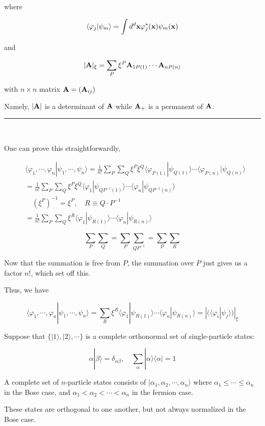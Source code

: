 where 

\[\langle\varphi_j|\psi_m\rangle = \int d^d {\bf x}\varphi_j^*({\bf x})\psi_m({\bf x}) \]

and

\[|{\bf A}|_{\xi} = \sum_{P}\xi^P {\bf A}_{1P(1)}\cdots{\bf A}_{nP(n)} \]

with $n\times n$ matrix ${\bf A} = ({\bf A}_{ij})$

Namely, $|{\bf A}|$ is a determinant of ${\bf A}$ while ${\bf A}_+$ is a permanent of ${\bf A}$. 

\hrule

\ 

One can prove this straightforwardly, 

\[\begin{split}
&\langle\varphi_1,\cdots,\varphi_n|\psi_1,\cdots,\psi_n\rangle =\frac{1}{n!}\sum_P\sum_Q\xi^P\xi^Q\langle\varphi_{P(1)}|\psi_{Q(1)}\rangle\cdots\langle\varphi_{P(n)}|\psi_{Q(n)}\rangle \\
& = \frac{1}{n!}\sum_{P}\sum_{Q}\xi^P\xi^Q\langle\varphi_1|\psi_{QP^{-1}(1)}\rangle\cdots\langle\varphi_n|\psi_{QP^{-1}(n)}\rangle\\
&\quad (\xi^P)^{-1} = \xi^P,\quad R\equiv Q\cdot P^{-1}\\
&= \frac{1}{n!} \sum_P\sum_Q\xi^R\langle\varphi_1|\psi_{R(1)}\rangle\cdots\langle\varphi_n|\psi_{R(n)}\rangle
\end{split}\]

\[\sum_P\sum_Q = \sum_P\sum_{QP^{-1}}=\sum_P\sum_R \]

Now that the summation is free from $P$, the summation over $P$ just gives us a factor $n!$, which set off this. 

Thus, we have

\[\langle\varphi_1,\cdots,\varphi_n|\psi_1,\cdots,\psi_n\rangle = \sum_R\xi^R\langle\varphi_1|\psi_{R(1)}\rangle\cdots\langle\varphi_n|\psi_{R(n)}\rangle = |(\langle\varphi_i|\psi_j\rangle)|_\xi \]

Suppose that $\{|1\rangle,|2\rangle,\cdots\}$ is a complete orthonormal set of single-particle states:

\[\alpha|\beta\rangle = \delta_{\alpha\beta},\quad\sum_{\alpha}|\alpha\rangle\langle\alpha| = 1 \]

A complete set of $n$-particle states consists of $|\alpha_1,\alpha_2,\cdots,\alpha_n\rangle$ where $\alpha_1\le\cdots\le\alpha_n$ in the Bose case, and $\alpha_1<\alpha_2<\cdots<\alpha_n$ in the fermion case. 

These states are orthogonal to one another, but not always normalized in the Bose case. 


